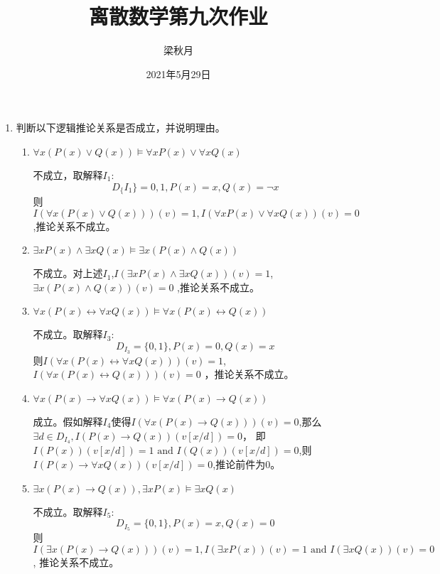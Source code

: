 \documentclass[UTF8]{ctexart}
\title{离散数学第九次作业}
\author{梁秋月}
\date{2021年5月29日}
\begin{document}
    \maketitle
    \begin{enumerate}
        \item 判断以下逻辑推论关系是否成立，并说明理由。
        \begin{enumerate}
            \item $\forall x(P(x) \vee  Q(x)) \models  \forall xP(x) \vee  \forall xQ(x)$
            
            不成立，取解释$I_1$:
            \[
                D_\{I_1\}={0,1},P(x)=x,Q(x)=\neg x
            \]
            则$I(\forall x(P(x)\vee Q(x)))(v)=1,I(\forall xP(x)\vee \forall xQ(x))(v)=0$,推论关系不成立。

            \item $\exists xP(x) \wedge  \exists xQ(x) \models  \exists x(P(x) \wedge  Q(x))$
            
            不成立。对上述$I_1$,$I(\exists xP(x)\wedge \exists xQ(x))(v)=1$,$\exists x(P(x)\wedge Q(x))(v)=0$
            ,推论关系不成立。

            \item $\forall x(P(x) \leftrightarrow  \forall xQ(x)) \models  \forall x(P(x) \leftrightarrow  Q(x))$
            
            不成立。取解释$I_3$:
            \[
                D_{I_3}=\{0,1\},P(x)=0,Q(x)=x
            \]
            则$I(\forall x(P(x)\leftrightarrow \forall xQ(x)))(v)=1$,$I(\forall x(P(x)\leftrightarrow Q(x)))(v)=0$
            ，推论关系不成立。
            
            \item $\forall x(P(x) \rightarrow  \forall xQ(x)) \models  \forall x(P(x) \rightarrow  Q(x))$
            
            成立。假如解释$I_4$使得$I(\forall x(P(x)\rightarrow Q(x)))(v)=0$,那么$\exists d\in D_{I_4},I(P(x)\rightarrow Q(x))(v[x/d])=0$，
            即$I(P(x))(v[x/d])=1 \text{ and }I(Q(x))(v[x/d])=0$,则$I(P(x)\rightarrow \forall xQ(x))(v[x/d])=0$,推论前件为0。

            
            \item $\exists x(P(x) \rightarrow  Q(x)), \exists xP(x) \models  \exists xQ(x)$
            
            不成立。取解释$I_5$:
            \[
                D_{I_5}=\{0,1\},P(x)=x,Q(x)=0
            \]
            则$I(\exists x(P(x)\rightarrow Q(x)))(v)=1,I(\exists xP(x))(v)=1 \text{ and } I(\exists xQ(x))(v)=0$,
            推论关系不成立。


\end{enumerate}
\end{enumerate}
\end{document}
